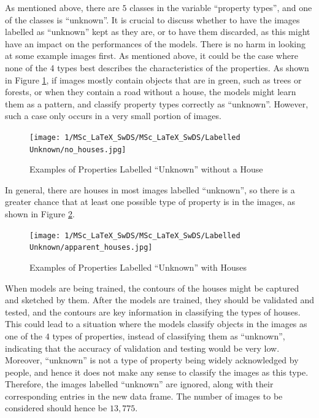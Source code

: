 \documentclass[11pt,twoside]{article}
\numberwithin{Theorem}{section}
\numberwithin{Definition}{section}
\numberwithin{Lemma}{section}
\numberwithin{Algorithm}{section}
\numberwithin{equation}{section}
\begin{document}
As mentioned above, there are $5$ classes in the variable “property types”, and one of the classes is “unknown”. It is crucial to discuss whether to have the images labelled as “unknown” kept as they are, or to have them discarded, as this might have an impact on the performances of the models. There is no harm in looking at some example images first. As mentioned above, it could be the case where none of the 4 types best describes the characteristics of the properties. As shown in Figure \ref{fig:unknown_green_road}, if images mostly contain objects that are in green, such as trees or forests, or when they contain a road without a house, the models might learn them as a pattern, and classify property types correctly as “unknown”. However, such a case only occurs in a very small portion of images. 

\begin{figure}[h]
\centering
\texttt{[image: 1/MSc\_LaTeX\_SwDS/MSc\_LaTeX\_SwDS/Labelled Unknown/no\_houses.jpg]}
\caption{Examples of Properties Labelled “Unknown” without a House}
\label{fig:unknown_green_road}
\end{figure}

In general, there are houses in most images labelled “unknown”, so there is a greater chance that at least one possible type of property is in the images, as shown in Figure \ref{fig:unknown_houses}. 

\begin{figure}[h]
\centering
\texttt{[image: 1/MSc\_LaTeX\_SwDS/MSc\_LaTeX\_SwDS/Labelled Unknown/apparent\_houses.jpg]}
\caption{Examples of Properties Labelled “Unknown” with Houses}
\label{fig:unknown_houses}
\end{figure}

When models are being trained, the contours of the houses might be captured and sketched by them. After the models are trained, they should be validated and tested, and the contours are key information in classifying the types of houses. This could lead to a situation where the models classify objects in the images as one of the $4$ types of properties, instead of classifying them as “unknown”, indicating that the accuracy of validation and testing would be very low. Moreover, “unknown” is not a type of property being widely acknowledged by people, and hence it does not make any sense to classify the images as this type. Therefore, the images labelled “unknown” are ignored, along with their corresponding entries in the new data frame. The number of images to be considered should hence be $13,775$.
\end{document}
